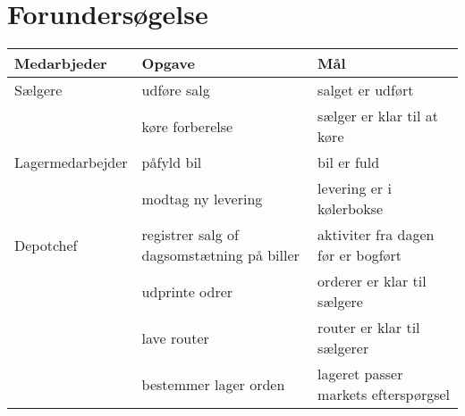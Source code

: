 \section{Forundersøgelse}\label{ch:forundersoegelse}

\begin{center}
\begin{tabular}{ |p{100pt}|p{100pt}|p{100pt}| }
    \hline
    Medarbjeder & Opgave & Mål \\
    \hline\hline
    Sælgere
    & udføre salg & salget er udført \\
    \hline
    & køre forberelse & sælger er klar til at køre \\
    \hline
    Lagermedarbejder
    & påfyld bil & bil er fuld \\
    \hline
    & modtag ny levering & levering er i kølerbokse \\
    \hline
    Depotchef
    & registrer salg of dagsomstætning på biller & aktiviter fra dagen før er bogført \\
    \hline
    & udprinte odrer & orderer er klar til sælgere \\
    \hline
    & lave router & router er klar til sælgerer \\
    \hline
    & bestemmer lager orden & lageret passer markets efterspørgsel \\
    \hline
\end{tabular}
\end{center}

